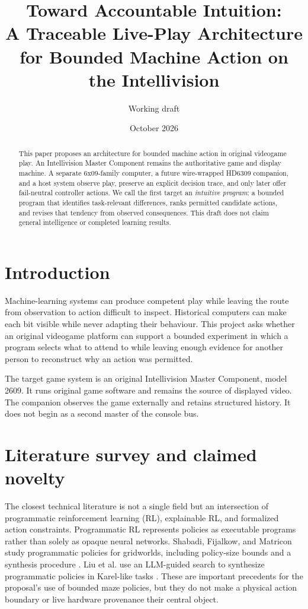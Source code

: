 \documentclass[11pt]{article}
\title{Toward Accountable Intuition:\\
A Traceable Live-Play Architecture for Bounded Machine Action on the Intellivision}
\author{Working draft}
\date{October 2026}
\begin{document}
\maketitle

\begin{abstract}
This paper proposes an architecture for bounded machine action in original
videogame play. An Intellivision Master Component remains the authoritative game
and display machine. A separate 6x09-family computer, a future wire-wrapped
HD6309 companion, and a host system observe play, preserve an explicit decision
trace, and only later offer fail-neutral controller actions. We call the first
target an \emph{intuitive program}: a bounded program that identifies
task-relevant differences, ranks permitted candidate actions, and revises that
tendency from observed consequences. This draft does not claim general
intelligence or completed learning results.
\end{abstract}

\section{Introduction}

Machine-learning systems can produce competent play while leaving the route from
observation to action difficult to inspect. Historical computers can make each
bit visible while never adapting their behaviour. This project asks whether an
original videogame platform can support a bounded experiment in which a program
selects what to attend to while leaving enough evidence for another person to
reconstruct why an action was permitted.

The target game system is an original Intellivision Master Component, model
2609. It runs original game software and remains the source of displayed video.
The companion observes the game externally and retains structured history. It
does not begin as a second master of the console bus.

\section{Literature survey and claimed novelty}

The closest technical literature is not a single field but an intersection of
programmatic reinforcement learning (RL), explainable RL, and formalized action
constraints. Programmatic RL represents policies as executable programs rather
than solely as opaque neural networks. Shabadi, Fijalkow, and Matricon study
programmatic policies for gridworlds, including policy-size bounds and a
synthesis procedure \cite{shabadi2024}. Liu et al. use an LLM-guided search to
synthesize programmatic policies in Karel-like tasks \cite{liu2024}. These are
important precedents for the proposal's use of bounded maze policies, but they
do not make a physical action boundary or live hardware provenance their
central object.
\end{document}
